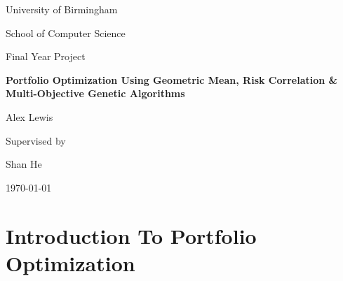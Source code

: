 \documentclass[11pt]{article}
\begin{document}
\begin{titlingpage}
    \centering\par
    {\huge University of Birmingham\par}
    {\small School of Computer Science\par}
        \vspace{0.9cm}
    {\Large Final Year Project\par}
        \vspace{0.9cm}
    {\Huge\bfseries Portfolio Optimization Using Geometric Mean, Risk Correlation 
        \& Multi-Objective Genetic Algorithms\par}
        \vspace{3cm}
    {\Large Alex Lewis\par}
        \vspace{0.9cm}
    {\tiny Supervised by\par}
    {\Large Shan He\par}
        \vspace{0.9cm}
    {\large \today \par}
        \vspace{0.5cm}
        \hrulefill
        \vspace{0.5cm}
    \begin{abstract}
            \vspace{0.1cm}
            An exploration of portfolio optimization theory with a classical geometric
            mean objective, and a novel risk correlation technique to create a secondary
            objective. Thus creating a multi-objective problem which can be applied to
            latest iteration of genetic algorithms - NSGA-II, this more computer science
            based approach tackles portfolio optimization from a new angle. Using the
            implementation documented in this project, the first steps of testing the
            viability of the solutions are then considered. And the space is opened
            up for future real world tests and possible extensions to the risk
            correlation technique. The results achieved in this project are not
            robust enough to replace any existing solutions, and with further testing
            could prove to be a viable alternative to the current options.
    \end{abstract}
\end{titlingpage}

\tableofcontents
\pagebreak

\section{Introduction To Portfolio Optimization}
\end{document}
